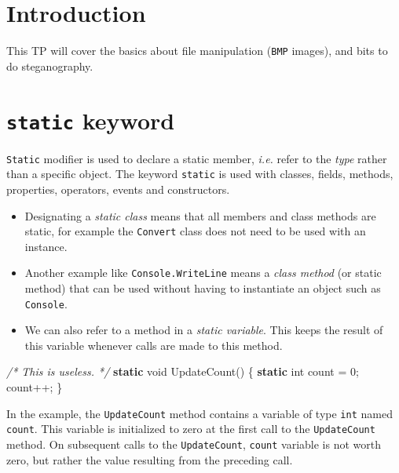 \documentclass[11pt, a4paper]{article}
\newenvironment{Shaded}{}{}
\newcommand{\KeywordTok}[1]{\textcolor[rgb]{0.00,0.44,0.13}{\textbf{{#1}}}}
\newcommand{\DataTypeTok}[1]{\textcolor[rgb]{0.56,0.13,0.00}{{#1}}}
\newcommand{\DecValTok}[1]{\textcolor[rgb]{0.25,0.63,0.44}{{#1}}}
\newcommand{\CommentTok}[1]{\textcolor[rgb]{0.38,0.63,0.69}{\textit{{#1}}}}
\newcommand{\FunctionTok}[1]{\textcolor[rgb]{0.02,0.16,0.49}{{#1}}}
\newcommand{\NormalTok}[1]{{#1}}
\begin{document}
\section{Introduction}\label{introduction}

This TP will cover the basics about file manipulation (\texttt{BMP}
images), and bits to do steganography.
\section{\texttt{static} keyword}\label{static-keyword}

\texttt{Static} modifier is used to declare a static member, \emph{i.e.}
refer to the \emph{type} rather than a specific object. The keyword
\texttt{static} is used with classes, fields, methods, properties,
operators, events and constructors. \newline

\begin{itemize}
\itemsep1pt\parskip0pt
\item
  Designating a \emph{static class} means that all members and class
  methods are static, for example the \texttt{Convert} class does not
  need to be used with an instance.
\item
  Another example like \texttt{Console.WriteLine} means a \emph{class
  method} (or static method) that can be used without having to
  instantiate an object such as \texttt{Console}.
\item
  We can also refer to a method in a \emph{static variable}. This keeps
  the result of this variable whenever calls are made to this method.
\end{itemize}

\begin{Shaded}
\begin{Highlighting}[]
\CommentTok{/* This is useless. */}
\KeywordTok{static} \DataTypeTok{void} \FunctionTok{UpdateCount}\NormalTok{()}
\NormalTok{\{}
    \KeywordTok{static} \DataTypeTok{int} \NormalTok{count = }\DecValTok{0}\NormalTok{;}
    \NormalTok{count++;}
\NormalTok{\}}
\end{Highlighting}
\end{Shaded}

In the example, the \texttt{UpdateCount} method contains a variable of
type \texttt{int} named \texttt{count}. This variable is initialized to
zero at the first call to the \texttt{UpdateCount} method. On subsequent
calls to the \texttt{UpdateCount}, \texttt{count} variable is not worth
zero, but rather the value resulting from the preceding call.
\end{document}

